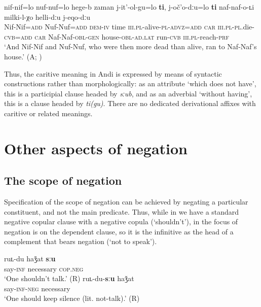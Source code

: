 \documentclass[output=paper,colorlinks=true, citecolor=brown]{langscibook}
\begin{document}
\ea
    \label{ex:and:59} 
    \gll nif-nif=lo nuf-nuf=lo hege{}-b zaman j{}-it’{}-ol{}-gu=lo \textbf{ti}, j{}-oč’o{}-dːu=lo \textbf{ti} naf-naf{}-o{}-ʟi milki{}-l{}-χo helli-dːu j-eqo-dːu \\
          Nif-Nif=\textsc{add} Nuf-Nuf=\textsc{add} \textsc{dem-iv} time \textsc{iii.pl}{}-alive-\textsc{pl-advz=add} \textsc{car} \textsc{iii.pl}{}-\textsc{pl}.die-\textsc{cvb=add} \textsc{car} Naf-Naf-\textsc{obl}{}-\textsc{gen} house-\textsc{obl}{}-\textsc{ad.lat} run-\textsc{cvb} \textsc{iii.pl}{}-reach-\textsc{prf} \\
    \glt ‘And Nif-Nif and Nuf-Nuf, who were then more dead than alive, ran to Naf-Naf’s house.’ (A; )
\z 

Thus, the caritive meaning in Andi is expressed by means of syntactic constructions rather than morphologically: as an attribute ‘which does not have’, this is a participial clause headed by \textit{sːub}, and as an adverbial ‘without having’, this is a clause headed by \textit{ti(gu)}. There are no dedicated derivational affixes with caritive or related meanings. 

\section{Other aspects of negation} \label{sec:and:4}

\subsection{The scope of negation} \label{sec:and:4.1}

Specification of the scope of negation can be achieved by negating a particular constituent, and not the main predicate. Thus, while in  we have a standard negative copular clause with a negative copula (‘shouldn’t’), in  the focus of negation is on the dependent clause, so it is the infinitive as the head of a complement that bears negation (‘not to speak’).

\ea\label{ex:and:60} 
    \ea\label{ex:and:60a}
        \gll  ruʟ{}-du haǯat \textbf{sːu}\\ 
               say-\textsc{inf} necessary \textsc{cop.neg} \\
        \glt ‘One shouldn’t talk.’ (R)
    \ex\label{ex:and:60b}
        \gll  ruʟ{}-du{}-\textbf{sːu} haǯat\\
               say-\textsc{inf-neg} necessary \\
        \glt ‘One should keep silence (lit. not-talk).’ (R)
    \z
\z 
\end{document}
